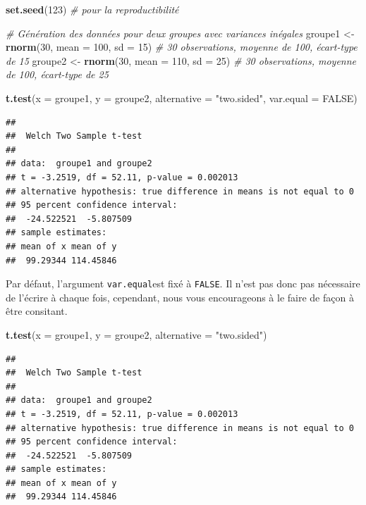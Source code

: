 \documentclass[
]{book}
\newenvironment{Shaded}{\begin{snugshade}}{\end{snugshade}}
\newcommand{\AttributeTok}[1]{\textcolor[rgb]{0.13,0.29,0.53}{#1}}
\newcommand{\CommentTok}[1]{\textcolor[rgb]{0.56,0.35,0.01}{\textit{#1}}}
\newcommand{\ConstantTok}[1]{\textcolor[rgb]{0.56,0.35,0.01}{#1}}
\newcommand{\DecValTok}[1]{\textcolor[rgb]{0.00,0.00,0.81}{#1}}
\newcommand{\FunctionTok}[1]{\textcolor[rgb]{0.13,0.29,0.53}{\textbf{#1}}}
\newcommand{\NormalTok}[1]{#1}
\newcommand{\OtherTok}[1]{\textcolor[rgb]{0.56,0.35,0.01}{#1}}
\newcommand{\StringTok}[1]{\textcolor[rgb]{0.31,0.60,0.02}{#1}}
\begin{document}
\begin{Shaded}
\begin{Highlighting}[]
\FunctionTok{set.seed}\NormalTok{(}\DecValTok{123}\NormalTok{) }\CommentTok{\# pour la reproductibilité}

\CommentTok{\# Génération des données pour deux groupes avec variances inégales}
\NormalTok{groupe1 }\OtherTok{\textless{}{-}} \FunctionTok{rnorm}\NormalTok{(}\DecValTok{30}\NormalTok{, }\AttributeTok{mean =} \DecValTok{100}\NormalTok{, }\AttributeTok{sd =} \DecValTok{15}\NormalTok{)  }\CommentTok{\# 30 observations, moyenne de 100, écart{-}type de 15}
\NormalTok{groupe2 }\OtherTok{\textless{}{-}} \FunctionTok{rnorm}\NormalTok{(}\DecValTok{30}\NormalTok{, }\AttributeTok{mean =} \DecValTok{110}\NormalTok{, }\AttributeTok{sd =} \DecValTok{25}\NormalTok{)  }\CommentTok{\# 30 observations, moyenne de 100, écart{-}type de 25}

\FunctionTok{t.test}\NormalTok{(}\AttributeTok{x =}\NormalTok{ groupe1, }\AttributeTok{y =}\NormalTok{ groupe2, }\AttributeTok{alternative =} \StringTok{"two.sided"}\NormalTok{, }\AttributeTok{var.equal =} \ConstantTok{FALSE}\NormalTok{)}
\end{Highlighting}
\end{Shaded}

\begin{verbatim}
## 
##  Welch Two Sample t-test
## 
## data:  groupe1 and groupe2
## t = -3.2519, df = 52.11, p-value = 0.002013
## alternative hypothesis: true difference in means is not equal to 0
## 95 percent confidence interval:
##  -24.522521  -5.807509
## sample estimates:
## mean of x mean of y 
##  99.29344 114.45846
\end{verbatim}

Par défaut, l'argument \texttt{var.equal}est fixé à \texttt{FALSE}. Il n'est pas donc pas nécessaire de l'écrire à chaque fois, cependant, nous vous encourageons à le faire de façon à être consitant.

\begin{Shaded}
\begin{Highlighting}[]
\FunctionTok{t.test}\NormalTok{(}\AttributeTok{x =}\NormalTok{ groupe1, }\AttributeTok{y =}\NormalTok{ groupe2, }\AttributeTok{alternative =} \StringTok{"two.sided"}\NormalTok{)}
\end{Highlighting}
\end{Shaded}

\begin{verbatim}
## 
##  Welch Two Sample t-test
## 
## data:  groupe1 and groupe2
## t = -3.2519, df = 52.11, p-value = 0.002013
## alternative hypothesis: true difference in means is not equal to 0
## 95 percent confidence interval:
##  -24.522521  -5.807509
## sample estimates:
## mean of x mean of y 
##  99.29344 114.45846
\end{verbatim}
\end{document}
